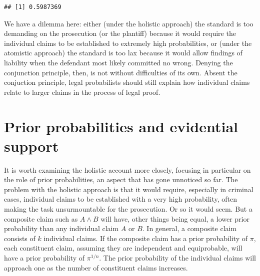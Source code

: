 \documentclass[10pt,dvipsnames,enabledeprecatedfontcommands]{scrartcl}
\begin{document}
\begin{verbatim}
## [1] 0.5987369
\end{verbatim}

We have a dilemma here: either (under the holistic approach) the
standard is too demanding on the prosecution (or the plantiff) because
it would require the individual claims to be established to extremely
high probabilities, or (under the atomistic approach) the standard is
too lax because it would allow findings of liability when the defendant
most likely committed no wrong. Denying the conjunction principle, then,
is not without difficulties of its own. Absent the conjuction principle,
legal probabilists should still explain how individual claims relate to
larger claims in the process of legal proof.

\hypertarget{prior-probabilities-and-evidential-support}{%
\section{Prior probabilities and evidential
support}\label{prior-probabilities-and-evidential-support}}

It is worth examining the holistic account more closely, focusing in
particular on the role of prior probabilities, an aspect that has gone
unnoticed so far. The problem with the holistic approach is that it
would require, especially in criminal cases, individual claims to be
established with a very high probability, often making the task
unsurmountable for the prosecution. Or so it would seem. But a composite
claim such as \(A\wedge B\) will have, other things being equal, a lower
prior probability than any individual claim \(A\) or \(B\). In general,
a composite claim consists of \(k\) individual claims. If the composite
claim has a prior probability of \(\pi\), each constituent claim,
assuming they are independent and equiprobable, will have a prior
probability of \(\pi^{1/n}\). The prior probability of the individual
claims will approach one as the number of constituent claims increases.
\end{document}
